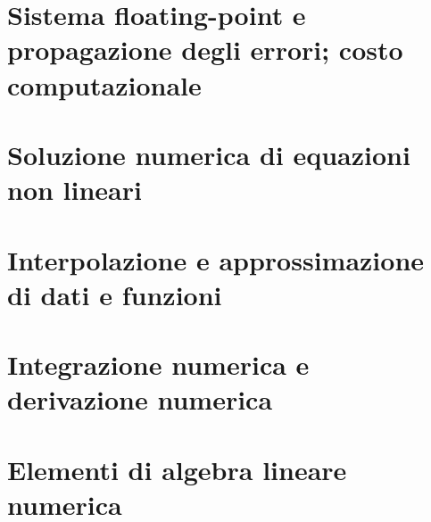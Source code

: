 \tableofcontents
\chapter{Sistema floating-point e propagazione degli errori; costo computazionale}








\chapter{Soluzione numerica di equazioni non lineari}





\chapter{Interpolazione e approssimazione di dati e funzioni}





\chapter{Integrazione numerica e derivazione numerica}




\chapter{Elementi di algebra lineare numerica}






